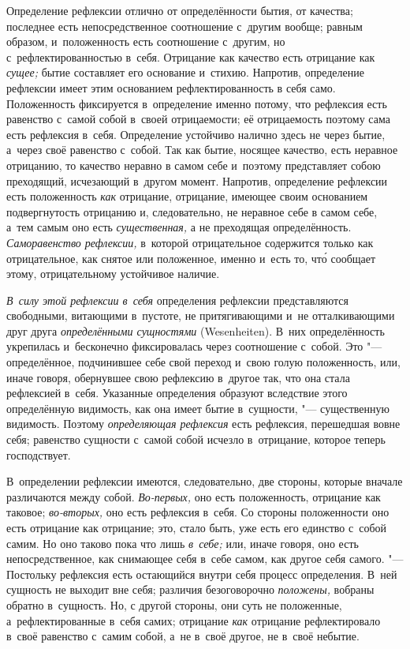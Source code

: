 Определение рефлексии отлично от определённости бытия, от качества;
последнее есть непосредственное соотношение с~другим вообще; равным
образом, и~положенность есть соотношение с~другим, но с~рефлектированностью
в~себя. Отрицание как качество есть отрицание как
{\em сущее;} бытие составляет его основание и~стихию.
Напротив, определение рефлексии имеет этим основанием рефлектированность в
себя само. Положенность фиксируется в~определение именно потому, что
рефлексия есть равенство с~самой собой в~своей отрицаемости; её
отрицаемость поэтому сама есть рефлексия в~себя. Определение устойчиво
налично здесь не через бытие, а~через своё равенство с~собой. Так как
бытие, носящее качество, есть неравное отрицанию, то качество неравно в
самом себе и~поэтому представляет собою преходящий, исчезающий в~другом
момент. Напротив, определение рефлексии есть положенность
{\em как} отрицание, отрицание, имеющее своим
основанием подвергнутость отрицанию и, следовательно, не неравное себе в
самом себе, а~тем самым оно есть {\em существенная,} а
не преходящая определённость. {\em Саморавенство
рефлексии,} в~которой отрицательное содержится только как отрицательное,
как снятое или положенное, именно и~есть то, чт\'{о} сообщает этому,
отрицательному устойчивое наличие.

{\em В~силу этой рефлексии в~себя} определения рефлексии
представляются свободными, витающими в~пустоте, не притягивающими и~не
отталкивающими друг друга {\em определёнными сущностями} (Wesenheiten). В~них
определённость укрепилась и~бесконечно
фиксировалась через соотношение с~собой. Это "--- определённое, подчинившее
себе свой переход и~свою голую положенность, или, иначе говоря, обернувшее
свою рефлексию в~другое так, что она стала рефлексией в~себя. Указанные
определения образуют вследствие этого определённую видимость, как она имеет
бытие в~сущности, "--- существенную видимость. Поэтому
{\em определяющая рефлексия} есть рефлексия, перешедшая
вовне себя; равенство сущности с~самой собой исчезло в~отрицание, которое
теперь господствует.

В~определении рефлексии имеются, следовательно, две стороны, которые вначале
различаются между собой. {\em Во-первых,} оно есть
положенность, отрицание как таковое; {\em во-вторых,}
оно есть рефлексия в~себя. Со стороны положенности оно есть отрицание как
отрицание; это, стало быть, уже есть его единство с~собой самим. Но оно
таково пока что лишь {\em в~себе;} или, иначе говоря,
оно есть непосредственное, как снимающее себя в~себе самом, как другое себя
самого. "--- Постольку рефлексия есть остающийся внутри себя процесс
определения. В~ней сущность не выходит вне себя; различия безоговорочно
{\em положены,} вобраны обратно в~сущность. Но, с
другой стороны, они суть не положенные, а~рефлектированные в~себя самих;
отрицание {\em как} отрицание рефлектировало в~своё
равенство с~самим собой, а~не в~своё другое, не в~своё небытие.

